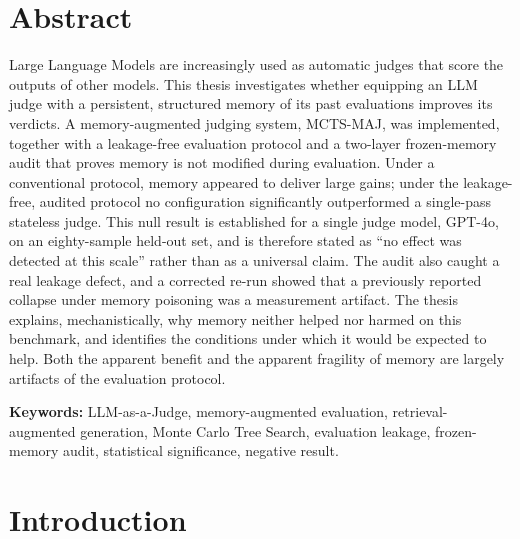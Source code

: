 \documentclass[14pt,a4paper]{extreport}
\begin{document}


\chapter*{Abstract}

Large Language Models are increasingly used as automatic judges that score the outputs of other models. This thesis investigates whether equipping an LLM judge with a persistent, structured memory of its past evaluations improves its verdicts. A memory-augmented judging system, MCTS-MAJ, was implemented, together with a leakage-free evaluation protocol and a two-layer frozen-memory audit that proves memory is not modified during evaluation. Under a conventional protocol, memory appeared to deliver large gains; under the leakage-free, audited protocol no configuration significantly outperformed a single-pass stateless judge. This null result is established for a single judge model, GPT-4o, on an eighty-sample held-out set, and is therefore stated as ``no effect was detected at this scale'' rather than as a universal claim. The audit also caught a real leakage defect, and a corrected re-run showed that a previously reported collapse under memory poisoning was a measurement artifact. The thesis explains, mechanistically, why memory neither helped nor harmed on this benchmark, and identifies the conditions under which it would be expected to help. Both the apparent benefit and the apparent fragility of memory are largely artifacts of the evaluation protocol.

\textbf{Keywords:} LLM-as-a-Judge, memory-augmented evaluation, retrieval-augmented generation, Monte Carlo Tree Search, evaluation leakage, frozen-memory audit, statistical significance, negative result.

\tableofcontents
\listoftables
{}
\listoffigures
{}

\chapter{Introduction}
\end{document}
